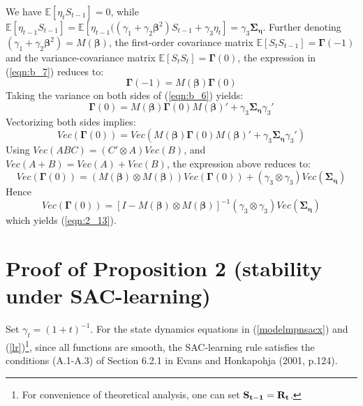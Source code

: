 \begin{appendix}
\noindent
We have $\mathbb{E} [\eta_t S_{t-1}]=0$, while $\mathbb{E} [\eta_{t-1}S_{t-1}]=\mathbb{E} [\eta_{t-1}((\gamma_1+\gamma_2\pmb {\beta}^2)S_{t-1}+\gamma_3 \eta_t]=\gamma_3 \pmb{\Sigma_{\eta}}$. Further denoting $(\gamma_1 + \gamma_2 \pmb{\beta}^2)=M(\pmb{\beta})$, the first-order covariance matrix  $\mathbb{E} [S_tS_{t-1}]=\pmb{\Gamma}(-1)$ and the variance-covariance matrix $\mathbb{E} [S_t S_t]=\pmb{\Gamma}(0) $, the expression in (\ref{eqn:b_7}) reduces to: 
\begin{equation}
\pmb{\Gamma}(-1)=M(\pmb {\beta})\pmb{\Gamma}(0)
\label{eqn:b_8}
\end{equation}
Taking the variance on both sides of (\ref{eqn:b_6}) yields: 
\begin{equation}
\pmb{\Gamma}(0)=M(\pmb{\beta})\pmb{\Gamma}(0) M(\pmb{\beta})'+\gamma_3\pmb{\Sigma_{\eta}}\gamma_3'\label{eqn:b_9}
\end{equation}
Vectorizing both sides implies:
\begin{equation}
Vec(\pmb{\Gamma}(0))=Vec(M(\pmb{\beta})\pmb{\Gamma}(0) M(\pmb{\beta})'+\gamma_3\pmb{\Sigma_{\eta}}\gamma_3')\label{eqn:b_10}
\end{equation}
Using $Vec(ABC)=(C'\otimes A)Vec(B)$, and $Vec(A+B)=Vec(A)+Vec(B)$, the expression above reduces to:
\begin{equation}
Vec(\pmb{\Gamma}(0))=(M(\pmb{ \beta})\otimes M(\pmb{ \beta}))Vec(\pmb{\Gamma}(0))+(\gamma_3 \otimes \gamma_3)Vec(\pmb{\Sigma_{\eta}})\label{eqn:b_11}
\end{equation}
Hence
\begin{equation}
Vec(\pmb{\Gamma}(0))=[I-M(\pmb{ \beta}) \otimes M(\pmb{\beta})]^{-1} (\gamma_3 \otimes \gamma_3)Vec(\pmb{\Sigma_{\eta}})\label{eqn:b_12}
\end{equation}
which yields (\ref{eqn:2_13}).
\section{Proof of Proposition 2 (stability under SAC-learning)}\label{sac}
Set $\gamma_t=(1+t)^{-1}$. For the state dynamics equations in
(\ref{modelmpnsacx}) and (\ref{lr})\footnote{For convenience of
theoretical analysis, one can set $\bf S_{t-1}=\bf R_t$.}, since all
functions are smooth, the SAC-learning rule satisfies the conditions
(A.1-A.3) of Section 6.2.1 in Evans and Honkapohja (2001, p.124).


\end{appendix}
